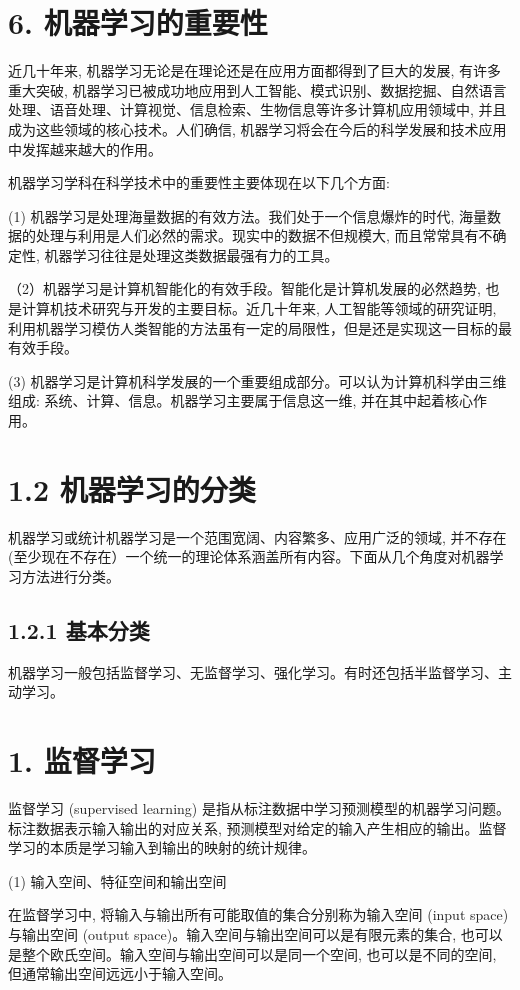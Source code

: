 \documentclass[10pt]{article}
\begin{document}
\begin{CJK*}{UTF8}{bsmi}
\section*{6. 机器学习的重要性}
近几十年来, 机器学习无论是在理论还是在应用方面都得到了巨大的发展, 有许多重大突破, 机器学习已被成功地应用到人工智能、模式识别、数据挖掘、自然语言处理、语音处理、计算视觉、信息检索、生物信息等许多计算机应用领域中, 并且成为这些领域的核心技术。人们确信, 机器学习将会在今后的科学发展和技术应用中发挥越来越大的作用。

机器学习学科在科学技术中的重要性主要体现在以下几个方面:

(1) 机器学习是处理海量数据的有效方法。我们处于一个信息爆炸的时代, 海量数据的处理与利用是人们必然的需求。现实中的数据不但规模大, 而且常常具有不确定性, 机器学习往往是处理这类数据最强有力的工具。

（2）机器学习是计算机智能化的有效手段。智能化是计算机发展的必然趋势, 也是计算机技术研究与开发的主要目标。近几十年来, 人工智能等领域的研究证明, 利用机器学习模仿人类智能的方法虽有一定的局限性，但是还是实现这一目标的最有效手段。

(3) 机器学习是计算机科学发展的一个重要组成部分。可以认为计算机科学由三维组成: 系统、计算、信息。机器学习主要属于信息这一维, 并在其中起着核心作用。

\section*{1.2 机器学习的分类}
机器学习或统计机器学习是一个范围宽阔、内容繁多、应用广泛的领域, 并不存在 (至少现在不存在）一个统一的理论体系涵盖所有内容。下面从几个角度对机器学习方法进行分类。

\subsection*{1.2.1 基本分类}
机器学习一般包括监督学习、无监督学习、强化学习。有时还包括半监督学习、主动学习。

\section*{1. 监督学习}
监督学习 (supervised learning) 是指从标注数据中学习预测模型的机器学习问题。标注数据表示输入输出的对应关系, 预测模型对给定的输入产生相应的输出。监督学习的本质是学习输入到输出的映射的统计规律。

(1) 输入空间、特征空间和输出空间

在监督学习中, 将输入与输出所有可能取值的集合分别称为输入空间 (input space) 与输出空间 (output space)。输入空间与输出空间可以是有限元素的集合, 也可以是整个欧氏空间。输入空间与输出空间可以是同一个空间, 也可以是不同的空间, 但通常输出空间远远小于输入空间。


\end{CJK*}
\end{document}
